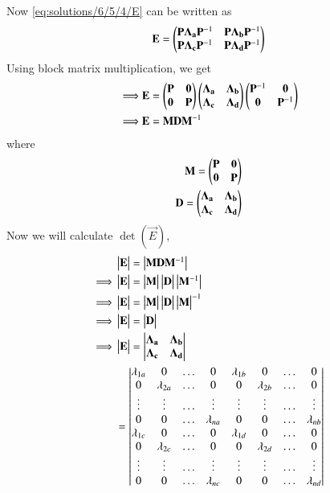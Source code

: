 Now \eqref{eq:solutions/6/5/4/E} can be written as
\begin{align}
    \mathbf{E}=\begin{pmatrix}\mathbf{P}\mathbf{\Lambda_a}\mathbf{P}^{-1} & \mathbf{P}\mathbf{\Lambda_b}\mathbf{P}^{-1}\\\mathbf{P}\mathbf{\Lambda_c}\mathbf{P}^{-1} & \mathbf{P}\mathbf{\Lambda_d}\mathbf{P}^{-1}\end{pmatrix}
\end{align}
Using block matrix multiplication, we get
\begin{align}
    \implies&\mathbf{E}=\begin{pmatrix}\mathbf{P} & \mathbf{0}\\\mathbf{0} & \mathbf{P}\end{pmatrix}\begin{pmatrix}\mathbf{\Lambda_a} & \mathbf{\Lambda_b}\\\mathbf{\Lambda_c} & \mathbf{\Lambda_d}\end{pmatrix}\begin{pmatrix}\mathbf{P}^{-1} & \mathbf{0}\\\mathbf{0} & \mathbf{P}^{-1}\end{pmatrix}\\
    \implies&\mathbf{E}=\mathbf{M}\mathbf{D}\mathbf{M}^{-1}\label{eq:solutions/6/5/4/Edec}
\end{align}
where
\begin{align}
    \mathbf{M}=\begin{pmatrix}\mathbf{P} & \mathbf{0}\\\mathbf{0} & \mathbf{P}\end{pmatrix}\\
    \mathbf{D}=\begin{pmatrix}\mathbf{\Lambda_a} & \mathbf{\Lambda_b}\\\mathbf{\Lambda_c} & \mathbf{\Lambda_d}\end{pmatrix}
\end{align}
Now we will calculate $\det(\vec{E})$,
\begin{align}
    &\begin{vmatrix}\mathbf{E}\end{vmatrix}=\begin{vmatrix}\mathbf{M}\mathbf{D}\mathbf{M}^{-1}\end{vmatrix}\\
    \implies&\begin{vmatrix}\mathbf{E}\end{vmatrix}=\begin{vmatrix}\mathbf{M}\end{vmatrix}\begin{vmatrix}\mathbf{D}\end{vmatrix}\begin{vmatrix}\mathbf{M}^{-1}\end{vmatrix}\\
    \implies&\begin{vmatrix}\mathbf{E}\end{vmatrix}=\begin{vmatrix}\mathbf{M}\end{vmatrix}\begin{vmatrix}\mathbf{D}\end{vmatrix}\begin{vmatrix}\mathbf{M}\end{vmatrix}^{-1}\\
    \implies&\begin{vmatrix}\mathbf{E}\end{vmatrix}=\begin{vmatrix}\mathbf{D}\end{vmatrix}\label{eq:solutions/6/5/4/EeqD}\\
    \implies&\begin{vmatrix}\mathbf{E}\end{vmatrix}=\begin{vmatrix}\mathbf{\Lambda_a} & \mathbf{\Lambda_b}\\\mathbf{\Lambda_c} & \mathbf{\Lambda_d}\end{vmatrix}\\
    &=\begin{vmatrix}\lambda_{1a}&0&\dots&0&\lambda_{1b}&0&\dots&0\\0&\lambda_{2a}&\dots&0&0&\lambda_{2b}&\dots&0\\\vdots&\vdots&\dots&\vdots&\vdots&\vdots&\dots&\vdots\\0&0&\dots&\lambda_{na}&0&0&\dots&\lambda_{nb}\\\lambda_{1c}&0&\dots&0&\lambda_{1d}&0&\dots&0\\0&\lambda_{2c}&\dots&0&0&\lambda_{2d}&\dots&0\\\vdots&\vdots&\dots&\vdots&\vdots&\vdots&\dots&\vdots\\0&0&\dots&\lambda_{nc}&0&0&\dots&\lambda_{nd}\end{vmatrix}
\end{align}
